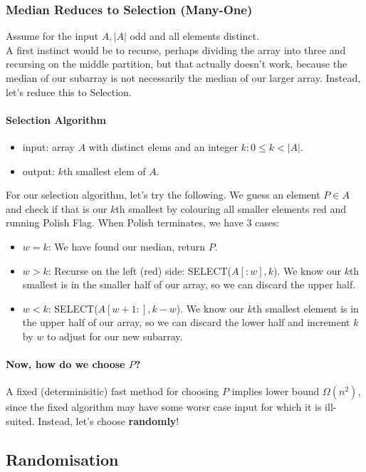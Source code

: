 \documentclass[11pt]{article}
\begin{document}
\subsubsection{Median Reduces to Selection (Many-One)}
Assume for the input $A, |A|$ odd and all elements distinct. \\
A first instinct would be to recurse, perhaps dividing the array into three and recursing on the
middle partition, but that actually doesn't work, because the median of our subarray is not
necessarily the median of our larger array. Instead, let's reduce this to Selection.
\paragraph{Selection Algorithm}
\begin{itemize}
    \item input: array $A$ with distinct elems and an integer $k:0\leq k < |A|$.
    \item output: $k$th smallest elem of $A$.
\end{itemize}
For our selection algorithm, let's try the following. We guess an element $P \in A$ and check if that
is our $k$th smallest by colouring all smaller elements red and running Polish Flag. When Polish
terminates, we have 3 cases:
\begin{itemize}
    \item $w=k$: We have found our median, return $P$.
    \item $w>k$: Recurse on the left (red) side: SELECT($A[:w],k$). We know our $k$th smallest is
        in the smaller half of our array, so we can discard the upper half.
    \item $w<k$: SELECT($A[w+1:],k-w$). We know our $k$th smallest element is in the upper half of
        our array, so we can discard the lower half and increment $k$ by $w$ to adjust for our new
        subarray.
\end{itemize}
\paragraph{Now, how do we choose $P$?} A fixed (determinisitic) fast method for choosing $P$ implies
lower bound $\Omega(n^2)$, since the fixed algorithm may have some worsr case input for which it is 
ill-suited. Instead, let's choose \textbf{randomly}!

\subsection{Randomisation}
\end{document}
